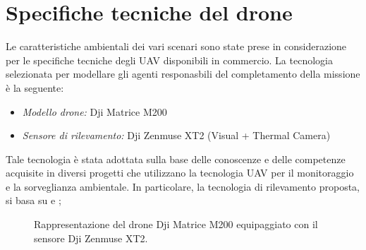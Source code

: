 \section{Specifiche tecniche del drone}

Le caratteristiche ambientali dei vari scenari sono state prese in considerazione per le specifiche tecniche degli UAV disponibili in commercio. 
La tecnologia selezionata per modellare gli agenti responasbili del completamento della missione è la seguente:
\begin{itemize}
    \item \textit{Modello drone:} Dji Matrice M200
    \item \textit{Sensore di rilevamento:} Dji Zenmuse XT2 (Visual + Thermal Camera) 
\end{itemize}
Tale tecnologia è stata adottata sulla base delle conoscenze e delle competenze acquisite in diversi progetti che utilizzano la tecnologia UAV per il monitoraggio e la sorveglianza ambientale. 
In particolare, la tecnologia di rilevamento proposta, si basa su \cite{persechino2010aerospace} e \cite{lega2012using};

\begin{figure}[H] 
    \captionsetup{justification=centering, margin=2cm, font=footnotesize}
    \begin{center}
    \end{center}
    \caption{Rappresentazione del drone Dji Matrice M200 equipaggiato con il sensore Dji Zenmuse XT2.}
    \label{dji_matrice}
\end{figure}

